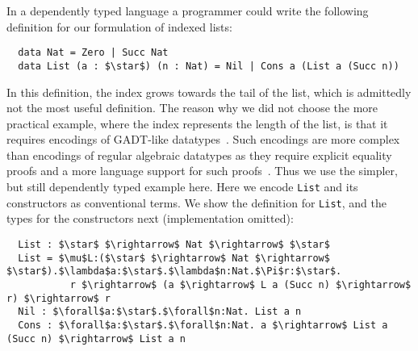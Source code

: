 In a dependently typed language a programmer could write the following definition
for our formulation of indexed lists:
\begin{lstlisting}
  data Nat = Zero | Succ Nat
  data List (a : $\star$) (n : Nat) = Nil | Cons a (List a (Succ n))
\end{lstlisting}
\noindent In this definition, the index grows towards the tail of the list,
which is admittedly not the most useful definition.
The reason why we did not choose the more practical
example, where the index represents the length of the list, is that it requires
encodings of GADT-like datatypes~\cite{gadt1,gadt2}. Such encodings are more
complex than encodings of regular algebraic datatypes as they require explicit
equality proofs and a more language support for such proofs~\cite{yang2019pure}. Thus we use the simpler,
but still dependently typed example here.
Here we encode \lstinline{List} and its constructors as conventional terms. We
show the definition for \lstinline{List}, and the types for the constructors next
(implementation omitted):
\begin{lstlisting}
  List : $\star$ $\rightarrow$ Nat $\rightarrow$ $\star$
  List = $\mu$L:($\star$ $\rightarrow$ Nat $\rightarrow$ $\star$).$\lambda$a:$\star$.$\lambda$n:Nat.$\Pi$r:$\star$.
           r $\rightarrow$ (a $\rightarrow$ L a (Succ n) $\rightarrow$ r) $\rightarrow$ r
  Nil : $\forall$a:$\star$.$\forall$n:Nat. List a n
  Cons : $\forall$a:$\star$.$\forall$n:Nat. a $\rightarrow$ List a (Succ n) $\rightarrow$ List a n
\end{lstlisting}
